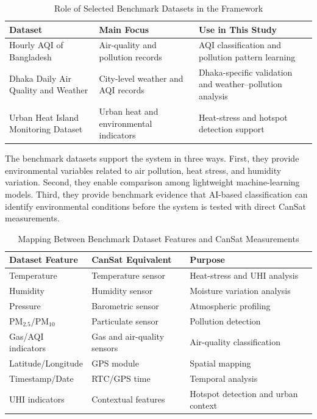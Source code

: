 \documentclass[conference]{IEEEtran}
\begin{document}
\begin{table}[!t]
\caption{Role of Selected Benchmark Datasets in the Framework}
\centering
\footnotesize
\begin{tabular}{p{2.4cm} p{2.3cm} p{2.6cm}}
\hline
\textbf{Dataset} & \textbf{Main Focus} & \textbf{Use in This Study} \\
\hline
Hourly AQI of Bangladesh & Air-quality and pollution records & AQI classification and pollution pattern learning \\
Dhaka Daily Air Quality and Weather & City-level weather and AQI records & Dhaka-specific validation and weather--pollution analysis \\
Urban Heat Island Monitoring Dataset & Urban heat and environmental indicators & Heat-stress and hotspot detection support \\
\hline
\end{tabular}
\label{tab:dataset_role}
\end{table}

The benchmark datasets support the system in three ways. First, they provide environmental variables related to air pollution, heat stress, and humidity variation. Second, they enable comparison among lightweight machine-learning models. Third, they provide benchmark evidence that AI-based classification can identify environmental conditions before the system is tested with direct CanSat measurements.

\begin{table}[!t]
\caption{Mapping Between Benchmark Dataset Features and CanSat Measurements}
\centering
\footnotesize
\begin{tabular}{p{2.3cm} p{2.4cm} p{2.5cm}}
\hline
\textbf{Dataset Feature} & \textbf{CanSat Equivalent} & \textbf{Purpose} \\
\hline
Temperature & Temperature sensor & Heat-stress and UHI analysis \\
Humidity & Humidity sensor & Moisture variation analysis \\
Pressure & Barometric sensor & Atmospheric profiling \\
PM$_{2.5}$/PM$_{10}$ & Particulate sensor & Pollution detection \\
Gas/AQI indicators & Gas and air-quality sensors & Air-quality classification \\
Latitude/Longitude & GPS module & Spatial mapping \\
Timestamp/Date & RTC/GPS time & Temporal analysis \\
UHI indicators & Contextual features & Hotspot detection and urban context \\
\hline
\end{tabular}
\label{tab:feature_mapping}
\end{table}
\end{document}

